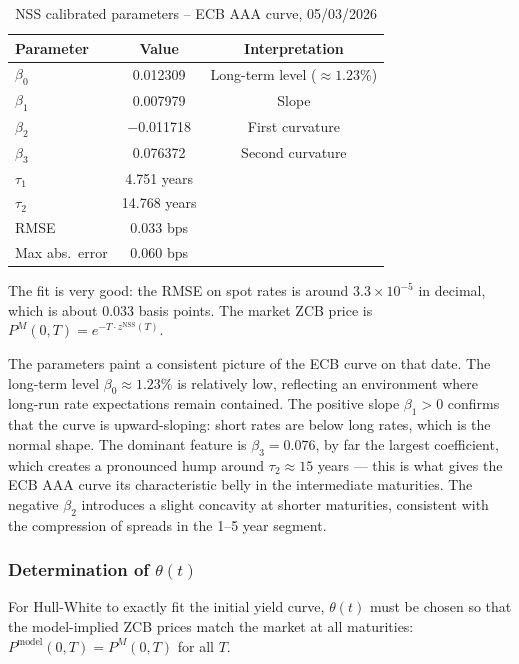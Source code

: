 \documentclass[12pt, a4paper]{article}
\begin{document}
\begin{table}[H]
\centering
\begin{tabular}{lcc}
\toprule
\textbf{Parameter} & \textbf{Value} & \textbf{Interpretation} \\
\midrule
$\beta_0$ & 0.012309 & Long-term level ($\approx 1.23\%$) \\
$\beta_1$ & 0.007979 & Slope \\
$\beta_2$ & $-$0.011718 & First curvature \\
$\beta_3$ & 0.076372 & Second curvature \\
$\tau_1$  & 4.751 years & \\
$\tau_2$  & 14.768 years & \\
\midrule
RMSE            & 0.033 bps & \\
Max abs.\ error & 0.060 bps & \\
\bottomrule
\end{tabular}
\caption{NSS calibrated parameters -- ECB AAA curve, 05/03/2026}
\end{table}

The fit is very good: the RMSE on spot rates is around $3.3 \times 10^{-5}$ in decimal, which is about $0.033$ basis points. The market ZCB price is $P^M(0,T) = e^{-T \cdot z^{\text{NSS}}(T)}$.

The parameters paint a consistent picture of the ECB curve on that date. The long-term level $\beta_0 \approx 1.23\%$ is relatively low, reflecting an environment where long-run rate expectations remain contained. The positive slope $\beta_1 > 0$ confirms that the curve is upward-sloping: short rates are below long rates, which is the normal shape. The dominant feature is $\beta_3 = 0.076$, by far the largest coefficient, which creates a pronounced hump around $\tau_2 \approx 15$ years — this is what gives the ECB AAA curve its characteristic belly in the intermediate maturities. The negative $\beta_2$ introduces a slight concavity at shorter maturities, consistent with the compression of spreads in the 1--5 year segment.

\subsubsection{Determination of $\theta(t)$}

For Hull-White to exactly fit the initial yield curve, $\theta(t)$ must be chosen so that the model-implied ZCB prices match the market at all maturities: $P^{\text{model}}(0,T) = P^M(0,T)$ for all $T$.
\end{document}
